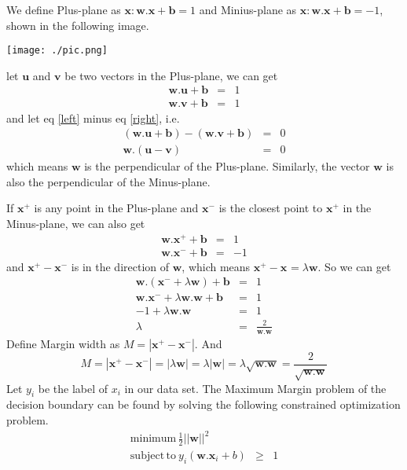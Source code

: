 \documentclass[11pt, oneside]{article}   	%
\begin{document}
We define Plus-plane as {$\mathbf{x} : \mathbf{w} . \mathbf{x} + \mathbf{b} = 1 $} and Minius-plane as  {$\mathbf{x} : \mathbf{w} . \mathbf{x} + \mathbf{b} = -1 $}, shown in the following image.\\
\centerline{\texttt{[image: ./pic.png]} }
 
let $\mathbf{u}$ and $\mathbf{v}$ be two vectors in the Plus-plane, we can get 
\begin{eqnarray}
\mathbf{w} . \mathbf{u} + \mathbf{b} &=& 1 \label{left}\\
\mathbf{w} . \mathbf{v} + \mathbf{b} &=& 1 \label{right}
\end{eqnarray}  
and let eq \ref{left} minus eq \ref{right}, i.e.
\begin{eqnarray}
( \mathbf{w} . \mathbf{u} + \mathbf{b} ) - ( \mathbf{w} . \mathbf{v} + \mathbf{b} ) &=&  0 \\
\mathbf{w} . ( \mathbf{u} - \mathbf{v} ) &=&  0 
\end{eqnarray}  
which means $\mathbf{w}$ is the perpendicular of the Plus-plane. Similarly, the vector $\mathbf{w}$ is also the perpendicular of the Minus-plane. 

If $\mathbf{x^{+}}$ is any point in the Plus-plane and $\mathbf{x^{-}}$ is the closest point to $\mathbf{x^{+}}$ in the Minus-plane, we can also get 
\begin{eqnarray}
\mathbf{w} . \mathbf{x^{+}} + \mathbf{b} &=& 1 \\
\mathbf{w} . \mathbf{x^{-}} + \mathbf{b} &=& -1 
\end{eqnarray}
and $\mathbf{x^{+}} - \mathbf{x^{-}} $ is in the direction of $\mathbf{w}$, which means $\mathbf{x^{+}} - \mathbf{x^{}} = \lambda \mathbf{w}$.
So we can get
\begin{eqnarray}
\mathbf{w} . (\mathbf{x^{-}} + \lambda \mathbf{w}) + \mathbf{b} &=& 1 \\
\mathbf{w} . \mathbf{x^{-}} + \lambda \mathbf{w} . \mathbf{w} + \mathbf{b} &=& 1 \\
-1 + \lambda \mathbf{w} . \mathbf{w} &=& 1 \\
\lambda &=& \frac{2}{\mathbf{w} . \mathbf{w}}
\end{eqnarray}
Define Margin width as $M = |\mathbf{x^{+}} - \mathbf{x^{-}}|$. And\\
\begin{equation}
M = | \mathbf{x^{+}} - \mathbf{x^{-}}| = |\lambda \mathbf{w}| = \lambda |\mathbf{w}| = \lambda \sqrt{\mathbf{w}.\mathbf{w}} = \frac{2}{\sqrt{\mathbf{w} . \mathbf{w}}}
\end{equation}
Let $y_i$ be the label of $x_i$ in our data set. The Maximum Margin problem of the decision boundary can be found by solving the following constrained optimization problem.
\begin{eqnarray}
\mathrm{minimum}\,\frac{1}{2} || \mathbf{w} ||^{2}\\
\mathrm{subject\,to}\ y_i (\mathbf{w} . \mathbf{x}_i + b )&\ge&1
\end{eqnarray}
\end{document}
